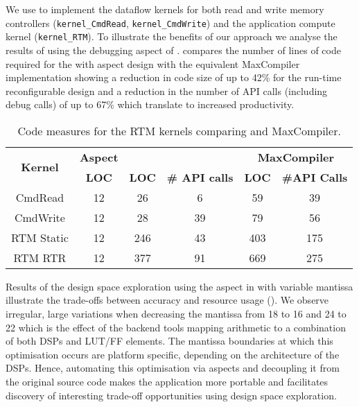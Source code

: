 We use \FAST{} to implement the dataflow kernels for both read and
write memory controllers (\texttt{kernel\_CmdRead},
\texttt{kernel\_CmdWrite}) and the application compute kernel
(\texttt{kernel\_RTM}).  To illustrate the benefits of our approach we
analyse the results of using the debugging aspect of
.  compares the number of lines
of code required for the \FAST{} with aspect design with the
equivalent MaxCompiler implementation showing a reduction in code size
of up to 42\% for the run-time reconfigurable design and a reduction
in the number of API calls (including debug calls) of up to 67\% which
translate to increased productivity.

\begin{table}[!h]

  \centering
  \begin{tabular}{c|ccc|cc}
    \hline
    \multirow{2}{*}{\bf{Kernel}} & \bf{Aspect } & \multicolumn{2}{c|}{\bf{\FAST{}}} & \multicolumn{2}{c}{\bf{MaxCompiler}}                   \\
    \                            & \bf{LOC}     & \bf{LOC}                       & \bf{\# API calls} & \bf{LOC} & \bf{\#API Calls} \\
    \hline \hline
    CmdRead                      & 12           & 26                             &      6         & 59       &      39        \\
    CmdWrite                     & 12           & 28                             &      39        & 79      &       56         \\
    RTM Static                   & 12           & 246                            &     43         & 403     &       175        \\
    RTM RTR                      & 12           & 377                            &     91         & 669     &       275       \\
  \end{tabular}
  \caption{Code measures for the RTM kernels comparing \FAST{} and
    MaxCompiler.}
  \label{table:loc}
\end{table}

Results of the design space exploration using the aspect in
 with variable mantissa illustrate
the trade-offs between accuracy and resource usage
(). We observe irregular, large variations
when decreasing the mantissa from 18 to 16 and 24 to 22 which is the
effect of the backend tools mapping arithmetic to a combination of
both DSPs and LUT/FF elements. The mantissa boundaries at which this
optimisation occurs are platform specific, depending on the
architecture of the DSPs. Hence, automating this optimisation via
aspects and decoupling it from the original source code makes the
application more portable and facilitates discovery of interesting
trade-off opportunities using design space exploration.

